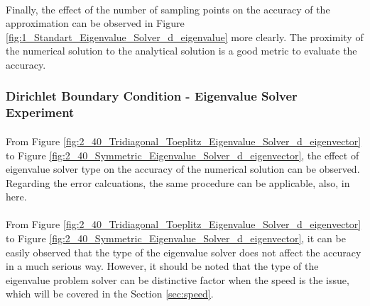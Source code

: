 \documentclass[letterpaper,12pt]{article}
\begin{document}
\paragraph{} Finally, the effect of the number of sampling points on the accuracy of the approximation can be observed in Figure \ref{fig:1_Standart_Eigenvalue_Solver_d_eigenvalue} more clearly. The proximity of the numerical solution to the analytical solution is a good metric to evaluate the accuracy.
    
\subsubsection{Dirichlet Boundary Condition - Eigenvalue Solver Experiment}

\paragraph{} From Figure \ref{fig:2_40_Tridiagonal_Toeplitz_Eigenvalue_Solver_d_eigenvector} to Figure \ref{fig:2_40_Symmetric_Eigenvalue_Solver_d_eigenvector}, the effect of eigenvalue solver type on the accuracy of the numerical solution can be observed. Regarding the error calcuations, the same procedure can be applicable, also, in here.

\paragraph{}From Figure \ref{fig:2_40_Tridiagonal_Toeplitz_Eigenvalue_Solver_d_eigenvector} to Figure \ref{fig:2_40_Symmetric_Eigenvalue_Solver_d_eigenvector}, it can be easily observed that the type of the eigenvalue solver does not affect the accuracy in a much serious way. However, it should be noted that the type of the eigenvalue problem solver can be distinctive factor when the speed is the issue, which will be covered in the Section \ref{sec:speed}.
\end{document}
